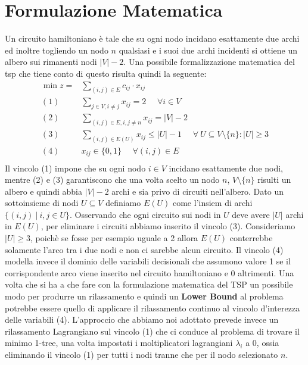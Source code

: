 \documentclass[
	article,			%
	12pt,				%
	oneside,			%
	a4paper,			%
	english,			%
	italian,				%
	sumario=tradicional,
	]{abntex2}
\begin{document}
\section{Formulazione Matematica}
Un circuito hamiltoniano è tale che su ogni nodo incidano esattamente due archi ed inoltre togliendo un nodo $n$ qualsiasi e i suoi due archi incidenti si ottiene un albero sui rimanenti nodi $|V| - 2$. Una possibile formalizzazione matematica del tsp che tiene conto di questo risulta quindi la seguente:
\begin{equation*}
    \begin{split}
        \min z = & \sum_{(i,j) \in E} c_{ij} \cdot x_{ij}\\
        (1)\:\:\:\:\:\: & \sum_{j \in V, i \neq j} x_{ij} = 2 \:\:\:\:\:\: \forall i \in V \\
        (2) \:\:\:\:\:\: & \sum_{(i,j)\in E, i, j \neq n} x_{ij} = |V|-2 \\
        (3) \:\:\:\:\:\: & \sum_{(i,j) \in E(U)} x_{ij} \leq |U| - 1 \:\:\:\:\:\: \forall\: U \subseteq V\setminus\{n\} : |U| \geq 3 \\
        (4) \:\:\:\:\:\: & x_{ij} \in \{0,1\} \:\:\:\:\:\: \forall (i,j) \in E\\
    \end{split}
\end{equation*}
Il vincolo (1) impone che su ogni nodo $i \in V$ incidano esattamente due nodi, mentre (2) e (3) garantiscono che una volta scelto un nodo $n$, $V \setminus \{n\}$ risulti un albero e quindi abbia $|V|-2$ archi e sia privo di circuiti nell'albero. 
\newline
Dato un sottoinsieme di nodi $U \subseteq V$ definiamo $E(U)$ come l'insiem di archi $\{ (i,j) \:|\: i,j \in U \}$.  Osservando che ogni circuito sui nodi in $U$ deve avere $|U|$ archi in $E(U)$, per eliminare i circuiti abbiamo inserito il vincolo (3). Consideriamo $|U| \geq 3$, poichè se fosse per esempio uguale a 2 allora $E(U)$ conterrebbe solamente l'arco tra i due nodi e non ci sarebbe alcun circuito. Il vincolo (4) modella invece il dominio delle variabili decisionali che assumono valore 1 se il corrispondente arco viene inserito nel circuito hamiltoniano e 0 altrimenti.
\newline
Una volta che si ha a che fare con la formulazione matematica del TSP un possibile modo per produrre un rilassamento e quindi un \textbf{Lower Bound} al problema potrebbe essere quello di applicare il rilassamento continuo al vincolo d'interezza delle variabili (4).
\newline
L'approccio che abbiamo noi adottato prevede invece un rilassamento Lagrangiano sul vincolo (1) che ci conduce al problema di trovare il minimo 1-tree, una volta impostati i moltiplicatori lagrangiani $\lambda_i$ a 0, ossia eliminando il vincolo (1) per tutti i nodi tranne che per il nodo selezionato $n$.
\end{document}
